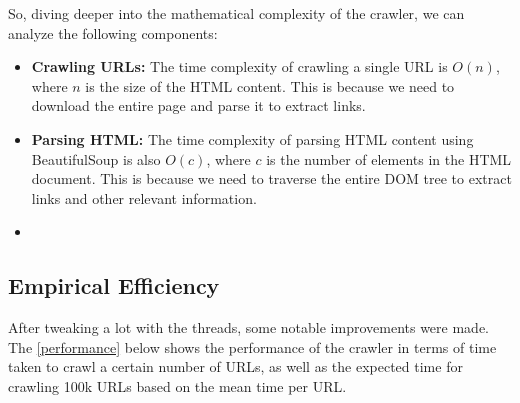 So, diving deeper into the mathematical complexity of the crawler, we can analyze the following components:

\begin{itemize}
  \item \textbf{Crawling URLs:} The time complexity of crawling a single URL is $O(n)$, where $n$ is the size of the HTML content. This is because we need to download the entire page and parse it to extract links.
  \item \textbf{Parsing HTML:} The time complexity of parsing HTML content using BeautifulSoup is also $O(c)$, where $c$ is the number of elements in the HTML document. This is because we need to traverse the entire DOM tree to extract links and other relevant information.
  \item
\end{itemize}

\subsection{Empirical Efficiency}

After tweaking a lot with the threads, some notable improvements were made. The \autoref{performance} below shows the performance of the crawler in terms of time taken to crawl a certain number of URLs, as well as the expected time for crawling 100k URLs based on the mean time per URL.

